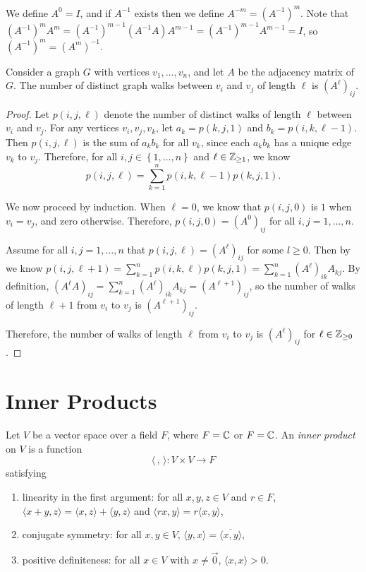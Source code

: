We define $A^0 = I$, and if $A^{-1}$ exists then we define $A^{-m} = (A^{-1})^m$. Note that $(A^{-1})^mA^m = (A^{-1})^{m-1}(A^{-1}A)A^{m-1} = (A^{-1})^{m-1}A^{m-1} = I$, so $(A^{-1})^m = (A^m)^{-1}$.

\begin{thm}
    Consider a graph $G$ with vertices $v_1, \ldots, v_n$, and let $A$ be the adjacency matrix of $G$. The number of distinct graph walks between $v_i$ and $v_j$ of length $\ell$ is $(A^{\ell})_{ij}$.
\end{thm}

\begin{proof}
Let $p(i, j, \ell)$ denote the number of distinct walks of length $\ell$ between $v_i$ and $v_j$. For any vertices $v_i, v_j, v_k$, let $a_k = p(k, j, 1)$ and $b_k = p(i, k, \ell-1)$. Then $p(i, j, \ell)$ is the sum of $a_kb_k$ for all $v_k$, since each $a_kb_k$ has a unique edge $v_k$ to $v_j$. Therefore, for all $i, j \in \left\{1, \ldots, n\right\}$ and $\ell \in \mathbb{Z}_{\geq 1}$, we know \[p(i, j, \ell) = \sum_{k=1}^n p(i,k,\ell-1)p(k,j,1).\]

We now proceed by induction. When $\ell = 0$, we know that $p(i, j, 0)$ is $1$ when $v_i = v_j$, and zero otherwise. Therefore, $p(i, j, 0) = (A^0)_{ij}$ for all $i, j = 1,\ldots,n$.

Assume for all $i, j = 1,\ldots,n$ that $p(i, j, \ell) = (A^\ell)_{ij}$ for some $l \geq 0$. Then by we know $p(i, j, \ell + 1) = \sum_{k=1}^n p(i, k, \ell)p(k, j, 1) = \sum_{k=1}^n (A^\ell)_{ik}A_{kj}$. By definition, $(A^\ell A)_{ij} = \sum_{k=1}^n (A^\ell)_{ik}A_{kj} = (A^{\ell+1})_{ij}$, so the number of walks of length $\ell+1$ from $v_i$ to $v_j$ is $(A^{\ell+1})_{ij}$.

Therefore, the number of walks of length $\ell$ from $v_i$ to $v_j$ is $(A^{\ell})_{ij}$ for $\ell \in \mathbb{Z}_{\geq 0}$.
\end{proof}

\section{Inner Products}

\begin{defn}
    Let $V$ be a vector space over a field $F$, where $F = \mathbb{C}$ or $F = \mathbb{C}$. An \emph{inner product} on $V$ is a function
    \[\langle\,,\,\rangle: V \times V \to F\]
    satisfying
    \begin{enumerate}[label=(\arabic*)]
        \item linearity in the first argument: for all $x, y, z \in V$ and $r \in F$, $\langle x+y, z\rangle = \langle x,z\rangle + \langle y,z \rangle$ and $\langle rx, y\rangle = r\langle x,y\rangle$,
        \item conjugate symmetry: for all $x, y \in V$, $\langle y, x\rangle = \overline{\langle x, y\rangle}$,
        \item positive definiteness: for all $x \in V$ with $x \neq \vec{0}$, $\langle x, x \rangle > 0$.
    \end{enumerate}
\end{defn}

